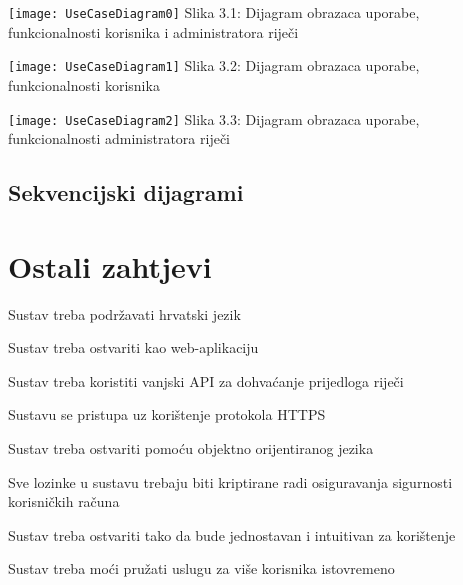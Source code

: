 
					\texttt{[image: UseCaseDiagram0]}
					Slika 3.1: Dijagram obrazaca uporabe, funkcionalnosti korisnika i administratora riječi
					
					\texttt{[image: UseCaseDiagram1]}
					Slika 3.2: Dijagram obrazaca uporabe, funkcionalnosti korisnika
					
					\texttt{[image: UseCaseDiagram2]}
					Slika 3.3: Dijagram obrazaca uporabe, funkcionalnosti administratora riječi
				
			\subsection{Sekvencijski dijagrami}
				
%				
	
		\section{Ostali zahtjevi}
		
			\begin{packed_enum}
				
				\item Sustav treba podržavati hrvatski jezik
				\item Sustav treba ostvariti kao web-aplikaciju
				\item Sustav treba koristiti vanjski API za dohvaćanje prijedloga riječi
				\item Sustavu se pristupa uz korištenje protokola HTTPS
				\item Sustav treba ostvariti pomoću objektno orijentiranog jezika
				\item Sve lozinke u sustavu trebaju biti kriptirane radi osiguravanja sigurnosti korisničkih računa
				\item Sustav treba ostvariti tako da bude jednostavan i intuitivan za korištenje
				\item Sustav treba moći pružati uslugu za više korisnika istovremeno
				
			\end{packed_enum}
		
